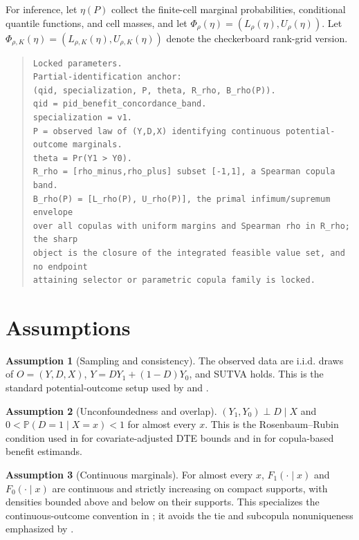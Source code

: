 \documentclass[11pt]{article}
\renewcommand{\Pr}{\mathbb{P}}
\theoremstyle{definition}
\newtheorem{assumption}{Assumption}
\theoremstyle{plain}
\theoremstyle{remark}
\begin{document}
For inference, let \(\eta(P)\) collect the finite-cell marginal probabilities, conditional quantile functions, and cell masses, and let \(\Phi_\rho(\eta)=(L_\rho(\eta),U_\rho(\eta))\).  Let \(\Phi_{\rho,K}(\eta)=(L_{\rho,K}(\eta),U_{\rho,K}(\eta))\) denote the checkerboard rank-grid version.

\begin{quote}
\begin{verbatim}
Locked parameters.
Partial-identification anchor:
(qid, specialization, P, theta, R_rho, B_rho(P)).
qid = pid_benefit_concordance_band.
specialization = v1.
P = observed law of (Y,D,X) identifying continuous potential-outcome marginals.
theta = Pr(Y1 > Y0).
R_rho = [rho_minus,rho_plus] subset [-1,1], a Spearman copula band.
B_rho(P) = [L_rho(P), U_rho(P)], the primal infimum/supremum envelope
over all copulas with uniform margins and Spearman rho in R_rho; the sharp
object is the closure of the integrated feasible value set, and no endpoint
attaining selector or parametric copula family is locked.
\end{verbatim}
\end{quote}

\section{Assumptions}\label{sec:assumptions}
\begin{assumption}[Sampling and consistency]\label{ass:sampling}
The observed data are i.i.d. draws of \(O=(Y,D,X)\), \(Y=DY_1+(1-D)Y_0\), and SUTVA holds.  This is the standard potential-outcome setup used by \citet{FanPark2010DTEBounds} and \citet{HeLi2026OrdinalCopula}.
\end{assumption}

\begin{assumption}[Unconfoundedness and overlap]\label{ass:unconf}
\((Y_1,Y_0)\perp D\mid X\) and \(0<\Pr(D=1\mid X=x)<1\) for almost every \(x\).  This is the Rosenbaum--Rubin condition used in \citet{FanPark2010DTEBounds} for covariate-adjusted DTE bounds and in \citet{HeLi2026OrdinalCopula} for copula-based benefit estimands.
\end{assumption}

\begin{assumption}[Continuous marginals]\label{ass:continuous}
For almost every \(x\), \(F_1(\cdot\mid x)\) and \(F_0(\cdot\mid x)\) are continuous and strictly increasing on compact supports, with densities bounded above and below on their supports.  This specializes the continuous-outcome convention in \citet{FanPark2010DTEBounds}; it avoids the tie and subcopula nonuniqueness emphasized by \citet{ZhangRichardson2025Kolmogorov}.
\end{assumption}
\end{document}
